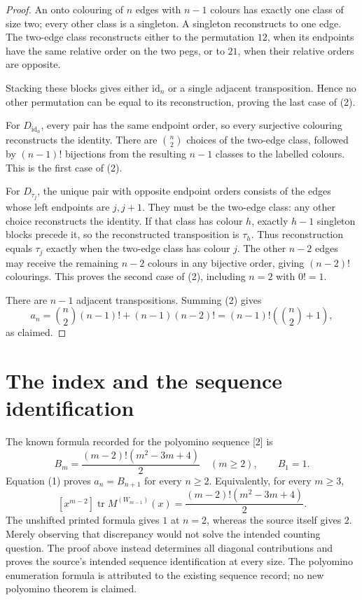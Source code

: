 \documentclass[11pt]{article}
\newcommand{\tr}{\operatorname{tr}}
\begin{document}
\begin{proof}
An onto colouring of \(n\) edges with \(n-1\) colours has
exactly one class of size two; every other class is a singleton.
A singleton reconstructs to one edge. The two-edge class
reconstructs either to the permutation \(12\), when its endpoints
have the same relative order on the two pegs, or to \(21\),
when their relative orders are opposite.

Stacking these blocks gives either \(\mathrm{id}_n\) or a single
adjacent transposition. Hence no other permutation can be equal
to its reconstruction, proving the last case of (2).

For \(D_{\mathrm{id}_n}\), every pair has the same endpoint order,
so every surjective colouring reconstructs the identity.
There are \(\binom n2\) choices of the two-edge class, followed
by \((n-1)!\) bijections from the resulting \(n-1\) classes
to the labelled colours. This is the first case of (2).

For \(D_{\tau_j}\), the unique pair with opposite endpoint orders
consists of the edges whose left endpoints are \(j,j+1\).
They must be the two-edge class: any other choice reconstructs
the identity. If that class has colour \(h\), exactly \(h-1\)
singleton blocks precede it, so the reconstructed transposition
is \(\tau_h\). Thus reconstruction equals \(\tau_j\) exactly
when the two-edge class has colour \(j\).
The other \(n-2\) edges may receive the remaining \(n-2\) colours
in any bijective order, giving \((n-2)!\) colourings.
This proves the second case of (2), including \(n=2\) with \(0!=1\).

There are \(n-1\) adjacent transpositions. Summing (2) gives
\[
 a_n=\binom n2(n-1)!+(n-1)(n-2)!
    =(n-1)!\left(\binom n2+1\right),
\]
as claimed.
\end{proof}

\section*{The index and the sequence identification}
The known formula recorded for the polyomino sequence [2] is
\[
 B_m=\frac{(m-2)!(m^2-3m+4)}2\quad(m\geq2),\qquad B_1=1.
\]
Equation (1) proves \(a_n=B_{n+1}\) for every \(n\geq2\).
Equivalently, for every \(m\geq3\),
\[
 [x^{m-2}]\tr M^{(W_{m-1})}(x)
       =\frac{(m-2)!(m^2-3m+4)}2.                         \tag{3}
\]
The unshifted printed formula gives \(1\) at \(n=2\),
whereas the source itself gives \(2\). Merely observing that
discrepancy would not solve the intended counting question.
The proof above instead determines all diagonal contributions
and proves the source's intended sequence identification at
every size. The polyomino enumeration formula is attributed
to the existing sequence record; no new polyomino theorem is claimed.
\end{document}
